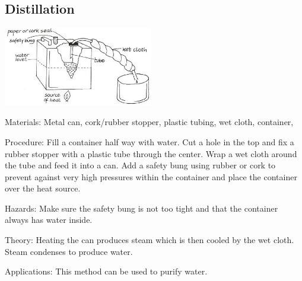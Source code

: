\begin{multicols}{2}
\subsection{Distillation}

\begin{center}
\includegraphics[width=0.49\textwidth]{./img/vso/distillation.jpg}
\end{center}

\begin{description*}
\item[Materials:]{Metal can, cork/rubber stopper, plastic tubing, wet cloth, container, }
\item[Procedure:]{Fill a container half way with water. Cut a hole in the top and fix a rubber stopper with a plastic tube through the center. Wrap a wet cloth around the tube and feed it into a can. Add a safety bung using rubber or cork to prevent against very high pressures within the container and place the container over the heat source.}
\item[Hazards:]{Make sure the safety bung is not too tight and that the container always has water inside.}
\item[Theory:]{Heating the can produces steam which is then cooled by the wet cloth. Steam condenses to produce water.}
\item[Applications:]{This method can be used to purify water.}
\end{description*}



\end{multicols}

\pagebreak